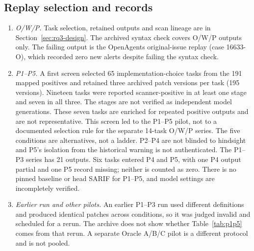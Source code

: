 \subsection*{Replay selection and records}
\begin{enumerate}\setlength{\itemsep}{1pt}
\item \emph{O/W/P.} Task selection, retained outputs and scan lineage are in Section~\ref{sec:rq3-design}. The archived syntax check covers O/W/P outputs only. The failing output is the OpenAgents original-issue replay (case 16633-O), which recorded zero new alerts despite failing the syntax check.
\item \emph{P1--P5.} A first screen selected 65 implementation-choice tasks from the 191 mapped positives and retained three archived patch versions per task (195 versions). Nineteen tasks were reported scanner-positive in at least one stage and seven in all three. The stages are not verified as independent model generations. These seven tasks are enriched for repeated positive outputs and are not representative. This screen led to the P1--P5 pilot, not to a documented selection rule for the separate 14-task O/W/P series. The five conditions are alternatives, not a ladder. P2--P4 are not blinded to hindsight and P5's isolation from the historical warning is not authenticated. The P1--P3 series has 21 outputs. Six tasks entered P4 and P5, with one P4 output partial and one P5 record missing; neither is counted as zero. There is no pinned baseline or head SARIF for P1--P5, and model settings are incompletely verified.
\item \emph{Earlier run and other pilots.} An earlier P1--P3 run used different definitions and produced identical patches across conditions, so it was judged invalid and scheduled for a rerun. The archive does not show whether Table~\ref{tab:p1p5} comes from that rerun. A separate Oracle A/B/C pilot is a different protocol and is not pooled.
\end{enumerate}


